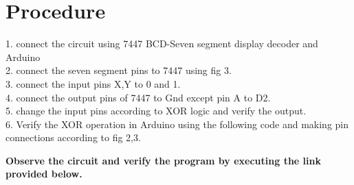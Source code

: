 \documentclass[journal,12pt,twocolumn]{IEEEtran}
\begin{document}
\section{Procedure}
1. connect the circuit using 7447 BCD-Seven segment display decoder and Arduino\\
2.  connect the seven segment pins to 7447 using fig 3.\\
3. connect the input pins X,Y to 0 and 1.\\
4. connect the output pins of 7447 to Gnd except pin A to D2.\\
5. change the input pins according to XOR logic and verify the output.\\ 
6. Verify the XOR operation in Arduino using the following code and making
pin connections according to fig 2,3.

\textbf{Observe the circuit and verify the program by executing the link provided below.}\\
\begin{center}
\end{center}
\end{document}
